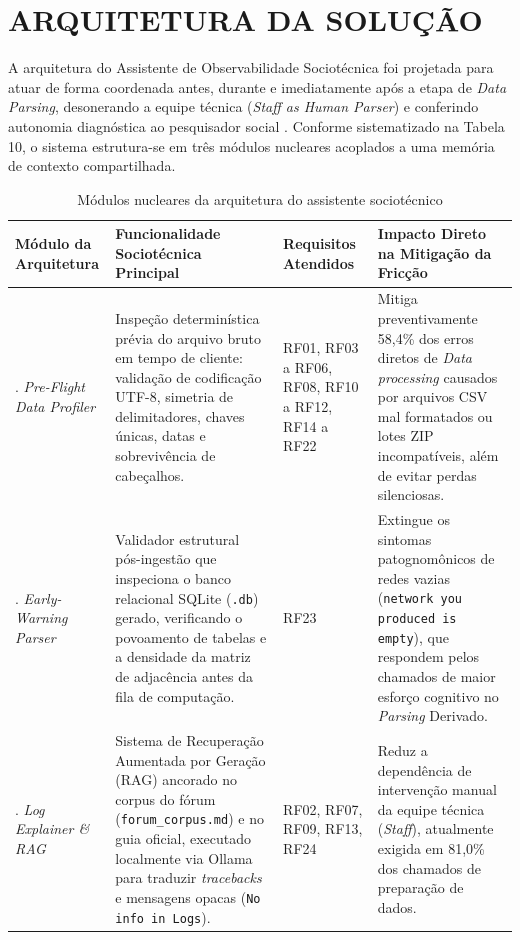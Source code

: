 \documentclass[
	oneside,
	a4paper,
	12pt,
	chapter=TITLE,
	section=TITLE,
	english,
	brazilian
]{abntex2}
\begin{document}
\FloatBarrier
\section{ARQUITETURA DA SOLUÇÃO}\label{sec:arquitetura_da_solucao}


A arquitetura do Assistente de Observabilidade Sociotécnica foi projetada para atuar de forma coordenada antes, durante e imediatamente após a etapa de \textit{Data Parsing}, desonerando a equipe técnica (\textit{Staff as Human Parser}) e conferindo autonomia diagnóstica ao pesquisador social \cite{CorText2026}. Conforme sistematizado na Tabela 10, o sistema estrutura-se em três módulos nucleares acoplados a uma memória de contexto compartilhada.

\begin{table}[htb]
  \caption{Módulos nucleares da arquitetura do assistente sociotécnico}
  \label{tab:tabela_10}
  \centering
  \small
  \setlength{\tabcolsep}{3.5pt}
  \begin{tabularx}{\textwidth}{|>{\raggedright\arraybackslash}p{3.0cm}|>{\raggedright\arraybackslash}X|>{\centering\arraybackslash}p{2.2cm}|>{\raggedright\arraybackslash}X|}
    \hline
    \textbf{Módulo da Arquitetura} & \textbf{Funcionalidade Sociotécnica Principal} & \textbf{Requisitos Atendidos} & \textbf{Impacto Direto na Mitigação da Fricção} \\ \hline
    1. \textit{Pre-Flight Data Profiler} & Inspeção determinística prévia do arquivo bruto em tempo de cliente: validação de codificação UTF-8, simetria de delimitadores, chaves únicas, datas e sobrevivência de cabeçalhos. & RF01, RF03 a RF06, RF08, RF10 a RF12, RF14 a RF22 & Mitiga preventivamente 58,4\% dos erros diretos de \textit{Data processing} causados por arquivos CSV mal formatados ou lotes ZIP incompatíveis, além de evitar perdas silenciosas. \\ \hline
    2. \textit{Early-Warning Parser} & Validador estrutural pós-ingestão que inspeciona o banco relacional SQLite (\texttt{.db}) gerado, verificando o povoamento de tabelas e a densidade da matriz de adjacência antes da fila de computação. & RF23 & Extingue os sintomas patognomônicos de redes vazias (\texttt{network you produced is empty}), que respondem pelos chamados de maior esforço cognitivo no \textit{Parsing} Derivado. \\ \hline
    3. \textit{Log Explainer \& RAG} & Sistema de Recuperação Aumentada por Geração (RAG) ancorado no corpus do fórum (\texttt{forum\_\allowbreak corpus.\allowbreak md}) e no guia oficial, executado localmente via Ollama para traduzir \textit{tracebacks} e mensagens opacas (\texttt{No info in Logs}). & RF02, RF07, RF09, RF13, RF24 & Reduz a dependência de intervenção manual da equipe técnica (\textit{Staff}), atualmente exigida em 81,0\% dos chamados de preparação de dados. \\ \hline
  \end{tabularx}
\end{table}
\FloatBarrier
\end{document}
